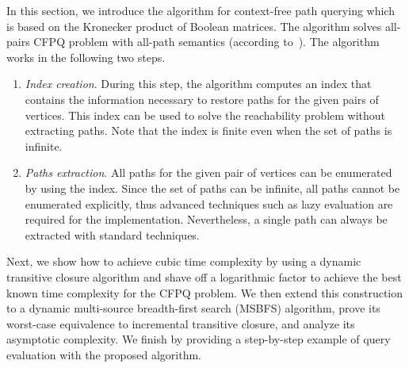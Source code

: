 
In this section, we introduce the algorithm for context-free path querying which is based on the Kronecker product of Boolean matrices.
The algorithm solves all-pairs CFPQ problem with all-path semantics (according to~\cite{hellingsPathQuerying}).
The algorithm works in the following two steps.
\begin{enumerate}
\item \emph{Index creation}.
 During this step, the algorithm computes an index that contains the information necessary to restore paths for the given pairs of vertices.
 This index can be used to solve the reachability problem without extracting paths.
 Note that the index is finite even when the set of paths is infinite.
\item \emph{Paths extraction}.
All paths for the given pair of vertices can be enumerated by using the index.
Since the set of paths can be infinite, all paths cannot be enumerated explicitly, thus advanced techniques such as lazy evaluation are required for the implementation.
Nevertheless, a single path can always be extracted with standard techniques.
\end{enumerate}

Next, we show how to achieve cubic time complexity by using a dynamic transitive closure algorithm and shave off a logarithmic factor to achieve the best known time complexity for the CFPQ problem.
We then extend this construction to a dynamic multi-source breadth-first search (MSBFS) algorithm, prove its worst-case equivalence to incremental transitive closure, and analyze its asymptotic complexity.
We finish by providing a step-by-step example of query evaluation with the proposed algorithm.




